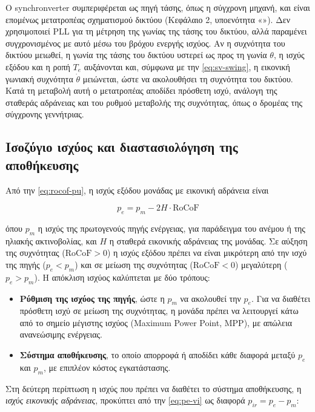 Ο synchronverter συμπεριφέρεται ως πηγή τάσης, όπως η σύγχρονη μηχανή, και είναι επομένως
μετατροπέας σχηματισμού δικτύου (Κεφάλαιο 2, υποενότητα «»). Δεν
χρησιμοποιεί PLL για τη μέτρηση της γωνίας της τάσης του δικτύου,
αλλά παραμένει συγχρονισμένος με αυτό μέσω του βρόχου ενεργής ισχύος. Αν η συχνότητα του
δικτύου μειωθεί, η γωνία της τάσης του δικτύου υστερεί ως προς τη γωνία $\theta$, η ισχύς
εξόδου και η ροπή $T_e$ αυξάνονται και, σύμφωνα με την \eqref{eq:sv-swing}, η εικονική γωνιακή
συχνότητα $\dot{\theta}$ μειώνεται, ώστε να ακολουθήσει τη συχνότητα του δικτύου. Κατά τη
μεταβολή αυτή ο μετατροπέας αποδίδει πρόσθετη ισχύ, ανάλογη της σταθεράς αδράνειας και του
ρυθμού μεταβολής της συχνότητας, όπως ο δρομέας της σύγχρονης γεννήτριας.

\subsection{Ισοζύγιο ισχύος και διαστασιολόγηση της αποθήκευσης}
\label{sec:vi-storage}

Από την \eqref{eq:rocof-pu}, η ισχύς εξόδου μονάδας με εικονική αδράνεια είναι

\begin{equation}
p_e = p_m - 2H \cdot \mathrm{RoCoF}
\label{eq:pe-vi}
\end{equation}

όπου $p_m$ η ισχύς της πρωτογενούς πηγής ενέργειας, για παράδειγμα του ανέμου ή της ηλιακής
ακτινοβολίας, και $H$ η σταθερά εικονικής αδράνειας της μονάδας. Σε αύξηση της συχνότητας
($\mathrm{RoCoF} > 0$) η ισχύς εξόδου πρέπει να είναι μικρότερη από την ισχύ της πηγής
($p_e < p_m$) και σε μείωση της συχνότητας ($\mathrm{RoCoF} < 0$) μεγαλύτερη ($p_e > p_m$).
Η απόκλιση ισχύος καλύπτεται με δύο τρόπους:

\begin{itemize}
\item \textbf{Ρύθμιση της ισχύος της πηγής}, ώστε η $p_m$ να ακολουθεί την $p_e$. Για να
      διαθέτει πρόσθετη ισχύ σε μείωση της συχνότητας, η μονάδα πρέπει να λειτουργεί κάτω από
      το σημείο μέγιστης ισχύος (Maximum Power Point, MPP), με απώλεια ανανεώσιμης ενέργειας.
\item \textbf{Σύστημα αποθήκευσης}, το οποίο απορροφά ή αποδίδει κάθε διαφορά μεταξύ $p_e$ και
      $p_m$, με επιπλέον κόστος εγκατάστασης.
\end{itemize}

Στη δεύτερη περίπτωση η ισχύς που πρέπει να διαθέτει το σύστημα αποθήκευσης, η \emph{ισχύς
εικονικής αδράνειας}, προκύπτει από την \eqref{eq:pe-vi} ως διαφορά $p_{ir} = p_e - p_m$:

